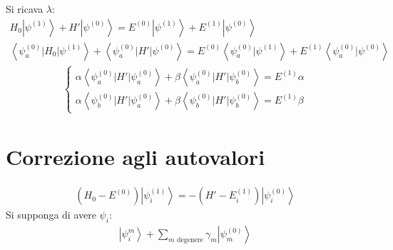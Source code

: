 Si ricava $\lambda$:
\begin{equation}\begin{split}
H_0\left |\psi ^{\left(1\right)} \right\rangle+H'\left |\psi ^{\left(0\right)} \right\rangle=E^{\left(0\right)}\left |\psi ^{\left(1\right)} \right\rangle+E^{\left(1\right)}\left |\psi ^{\left(0\right)} \right\rangle \\
\left\langle \psi _a^{\left(0\right)}|H_0|\psi ^{\left(1\right)} \right\rangle+\left\langle \psi _a^{\left(0\right)}|H'|\psi ^{\left(0\right)} \right\rangle=E^{\left(0\right)}\left\langle \psi _a^{\left(0\right)}|\psi ^{\left(1\right)} \right\rangle+E^{\left(1\right)}\left\langle \psi _a^{\left(0\right)}|\psi ^{\left(0\right)} \right\rangle
\end{split}\end{equation}
\begin{equation}\begin{split}
\begin{cases}
\alpha\left\langle \psi _a^{\left(0\right)}|H'|\psi _a^{\left(0\right)} \right\rangle+\beta\left\langle \psi _a^{\left(0\right)}|H'|\psi _b^{\left(0\right)} \right\rangle=E^{\left(1\right)}\alpha \\
\alpha\left\langle \psi _b^{\left(0\right)}|H'|\psi _a^{\left(0\right)} \right\rangle+\beta\left\langle \psi _b^{\left(0\right)}|H'|\psi _b^{\left(0\right)} \right\rangle=E^{\left(1\right)}\beta
\end{cases}
\end{split}\end{equation}


\section{Correzione agli autovalori} %
\begin{equation}\begin{split}
\left(H_0-E^{\left(0\right)}\right)\left |\psi _i^{\left(1\right)} \right\rangle=-\left(H'-E_i^{\left(1\right)}\right)\left |\psi _i^{\left(0\right)} \right\rangle
\end{split}\end{equation}
Si supponga di avere $\psi _i$:
\begin{equation}\begin{split}
\left |\psi _i^m \right\rangle+\sum_{m \textrm{ degenere}}{\gamma_m\left |\psi _m^{\left(0\right)} \right\rangle}
\end{split}\end{equation}

